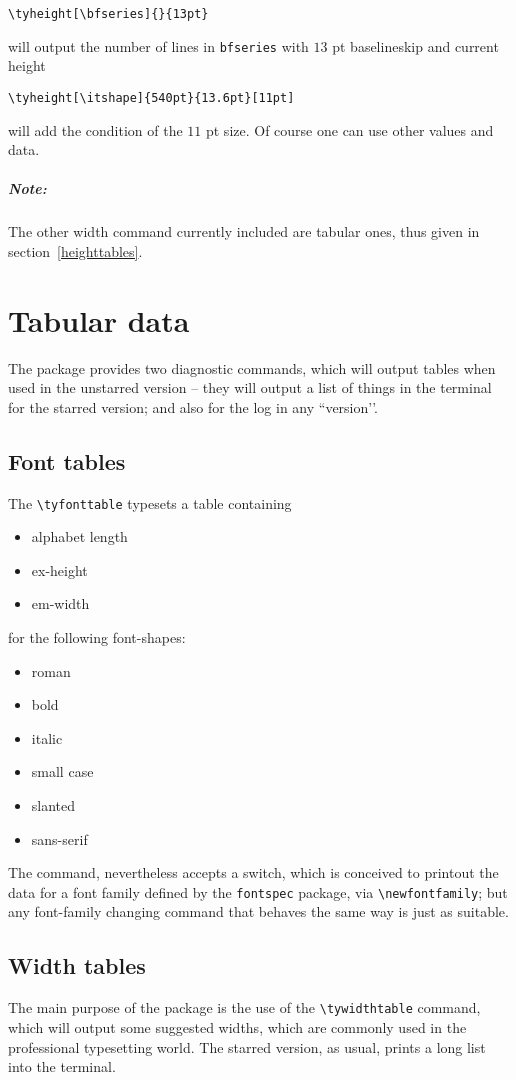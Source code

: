 \documentclass{article}
\makeatletter
\let\@@oldmpar\marginpar
\renewcommand{\marginpar}[1]{\@@oldmpar{\small#1}}
\makeatother
\begin{document}
\begin{verbatim}
\tyheight[\bfseries]{}{13pt}
\end{verbatim}
will output the number of lines in \texttt{bfseries} with $13$ pt baselineskip and current height

\begin{verbatim}
\tyheight[\itshape]{540pt}{13.6pt}[11pt]
\end{verbatim}
will add the condition of the $11$ pt size. Of course one can use other values and data.

\subparagraph{Note:} The other width command currently included are tabular ones, thus given in section~\vref{heighttables}.

\section{Tabular data}
The package provides two diagnostic commands, which will output tables when used in the unstarred version -- they will output a list of things in the terminal for the starred version; and also for the log in any ``version’’.
\subsection{Font tables}
The \marginpar{\textbackslash tyfonttable} \verb|\tyfonttable| typesets a table containing
\begin{itemize}
\item alphabet length
\item ex-height
\item em-width
\end{itemize}
for the following font-shapes:
\begin{itemize}
\item roman
\item bold
\item italic
\item small case
\item slanted
\item sans-serif
\end{itemize}

The command, nevertheless accepts a switch, which is conceived to printout the data for a font family defined by the \texttt{fontspec} package, via \verb|\newfontfamily|; but any font-family changing command that behaves the same way is just as suitable.

\subsection{Width tables}\label{widthtables}
The main purpose of the package is the use of the \marginpar{\textbackslash tywidthtable}\verb!\tywidthtable! command, which will output some suggested widths, which are commonly used \cite{bib:bringhurst,bib:felici} in the professional typesetting world. The starred version, as usual, prints a long list into the terminal.
\end{document}
